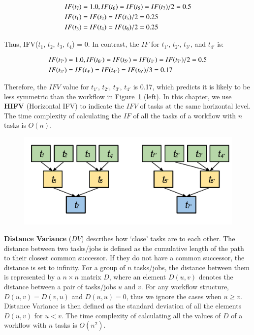 \begin{eqnarray*}
	\displaystyle  
	&IF(t_7 )=1.0, IF(t_6 )=IF(t_5 )=IF(t_7 )/2=0.5\nonumber  \\
	&IF(t_1 )=IF(t_2 )=IF(t_5 )/2=0.25\nonumber \\
	&IF(t_3 )=IF(t_4 )=IF(t_6 )/2=0.25\nonumber 
\end{eqnarray*}

Thus, IFV($t_1$, $t_2$, $t_3$, $t_4$) = 0. In contrast, the $IF$ for $t_{1'}$, $t_{2'}$, $t_{3'}$, and $t_{4'}$ is:

\begin{eqnarray*}
	\displaystyle  
	&IF(t_{7'})=1.0, IF(t_{6'})=IF(t_{5'})=IF(t_{1'})=IF(t_{7'})/2=0.5\nonumber \\
	&IF(t_{2'})=IF(t_{3'})=IF(t_{4'})=IF(t_{6'})/3=0.17 \nonumber
\end{eqnarray*}

Therefore, the $IFV$ value for {$t_{1'}$, $t_{2'}$, $t_{3'}$, $t_{4'}$} is 0.17, which predicts it is likely to be less symmetric than the workflow in Figure~\ref{fig:imbalance_hifv} (left). In this chapter, we use \textbf{HIFV} (Horizontal IFV) to indicate the $IFV$ of tasks at the same horizontal level. The time complexity of calculating the $IF$ of all the tasks of a workflow with $n$ tasks is $O(n)$.  

\begin{figure}[htb]
	\centering
	\includegraphics[width=0.75\linewidth]{figures/balance/figure7.pdf}
	\label{fig:imbalance_hifv}
\end{figure}

\textbf{Distance Variance} ($DV$) describes how `close' tasks are to each other. The distance between two tasks/jobs is defined as the cumulative length of the path to their closest common successor. If they do not have a common successor, the distance is set to infinity. For a group of $n$ tasks/jobs, the distance between them is represented by a $n \times n$ matrix $D$, where an element $D(u,v)$ denotes the distance between a pair of tasks/jobs $u$ and $v$. For any workflow structure, $D(u,v)=D(v,u)$ and $D(u,u)=0$, thus we ignore the cases when $u \geq v$. Distance Variance is then defined as the standard deviation of all the elements $D(u,v)$ for $u<v$. The time complexity of calculating all the values of $D$ of a workflow with $n$ tasks is $O(n^2)$. 

